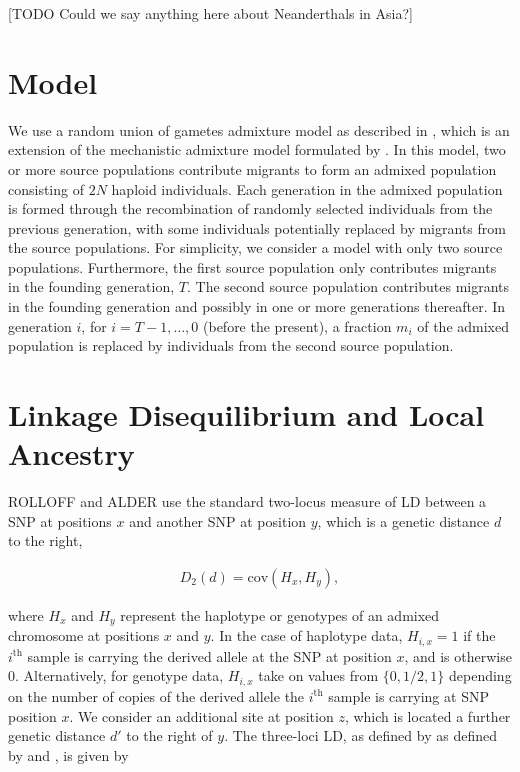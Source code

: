 [TODO Could we say anything here about Neanderthals in Asia?]

\section{Model}
We use a random union of gametes admixture model as described in
\cite{liang2014understanding}, which is an extension of the mechanistic
admixture model formulated by \cite{verdu2011general}. In this model, two or
more source populations contribute migrants to form an admixed population
consisting of $2N$ haploid individuals. Each generation in the admixed
population is formed through the recombination of randomly selected individuals
from the previous generation, with some individuals potentially replaced by
migrants from the source populations. For simplicity, we consider a model with
only two source populations. Furthermore, the first source population only
contributes migrants in the founding generation, $T$. The second source
population contributes migrants in the founding generation and possibly in one
or more generations thereafter. In generation $i$, for $i=T-1,\dots,0$ (before
the present), a fraction $m_i$ of the admixed population is replaced by
individuals from the second source population.

\section{Linkage Disequilibrium and Local Ancestry}
ROLLOFF and ALDER use the standard two-locus measure of LD between a SNP at
positions $x$ and another SNP at position $y$, which is a genetic distance $d$
to the right,

\begin{align}
	D_2(d) = \text{cov}(H_x,H_y),
	\label{D2}
\end{align}

where $H_x$ and $H_y$ represent the haplotype or genotypes of an admixed
chromosome at positions $x$ and $y$. In the case of haplotype data, $H_{i,x}=1$
if the $i^\text{th}$ sample is carrying the derived allele at the SNP at
position $x$, and is otherwise 0. Alternatively, for genotype data, $H_{i,x}$
take on values from $\{0,1/2,1\}$ depending on the number of copies of the
derived allele the $i^\text{th}$ sample is carrying at SNP position $x$.
We consider an additional site at position $z$, which is located a further
genetic distance $d'$ to the right of $y$. The three-loci LD, as defined by as
defined by \cite{bennett1952theory} and \cite{slatkin1972treating}, is given by

